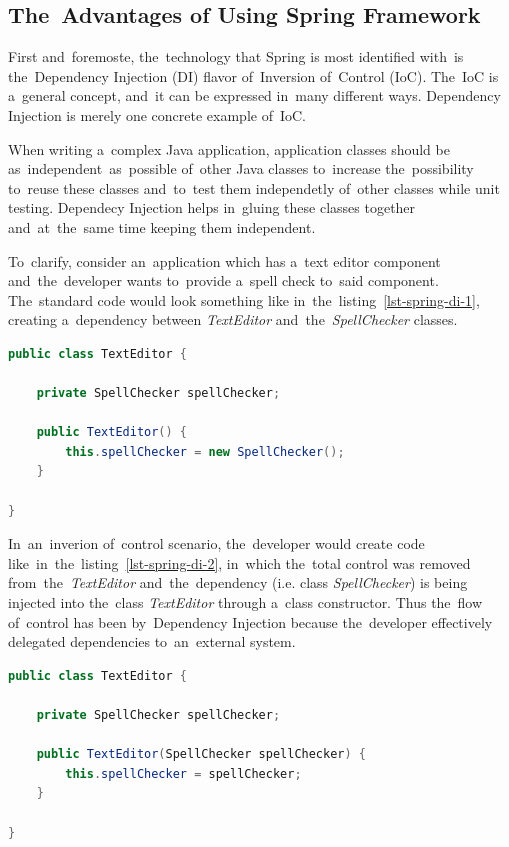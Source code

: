 \subsection{The~Advantages of Using Spring Framework}
First and~foremoste, the~technology that Spring is most identified with~is
the~Dependency Injection (DI) flavor of~Inversion of~Control (IoC). The~IoC is
a~general concept, and~it can be expressed in~many different ways. Dependency
Injection is merely one concrete example of~IoC.

When writing a~complex Java application, application classes should be
as~independent~as~possible of~other Java classes to~increase the~possibility
to~reuse these classes and~to~test them independetly of~other classes while unit
testing. Dependecy Injection helps in~gluing these classes together
and~at~the~same time keeping them independent.

To~clarify, consider an~application which has a~text editor component
and~the~developer wants to~provide a~spell check to~said component. The~standard
code would look something like in~the~listing~\ref{lst-spring-di-1}, creating
a~dependency between \textit{TextEditor} and~the~\textit{SpellChecker} classes.

\vspace{1mm}
\begin{lstlisting}[caption=The~standard way of~providing spell checking
to~a~component., style=dp-default, language=Java, label=lst-spring-di-1] 
public class TextEditor {
	
	private SpellChecker spellChecker;
	
	public TextEditor() {
		this.spellChecker = new SpellChecker();
	}
	
}
\end{lstlisting}

In~an~inverion of~control scenario, the~developer would create code
like~in~the~listing~\ref{lst-spring-di-2}, in~which the~total control was
removed from~the~\textit{TextEditor} and~the~dependency (i.e. class
\textit{SpellChecker}) is being injected into the~class \textit{TextEditor}
through a~class constructor. Thus the~flow of~control has been 
by~Dependency Injection because the~developer effectively delegated dependencies
to~an~external system.

\begin{lstlisting}[caption=The~Inversion of~Control scenario of~providing
a~\textit{SpellChecker} to~the~\textit{TextEditor} component., style=dp-default,
language=Java, label=lst-spring-di-2]
public class TextEditor {
	
	private SpellChecker spellChecker;
	
	public TextEditor(SpellChecker spellChecker) {
		this.spellChecker = spellChecker;
	}
	
}
\end{lstlisting}

